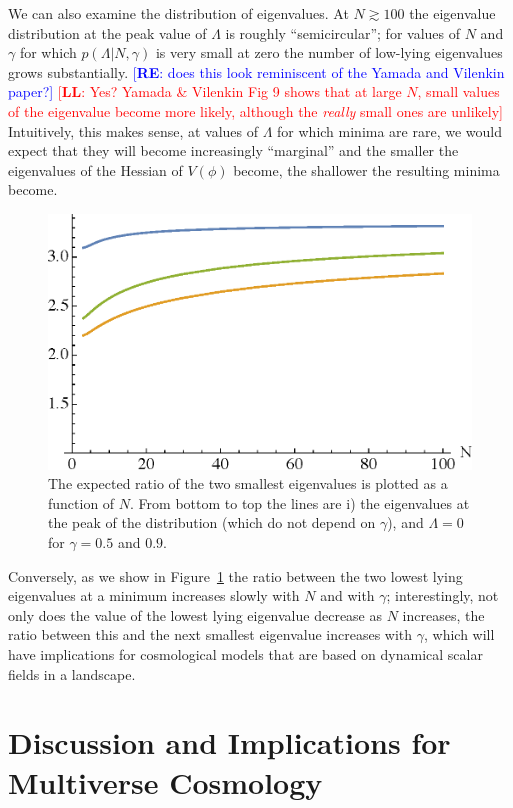 \documentclass[12pt]{article}
\newcommand{\re}[1]{\textcolor{blue}{[{\bf RE}: #1]}}
\newcommand{\lfl}[1]{\textcolor{red}{[{\bf LL}: #1]}}
\begin{document}
We can also examine the distribution of eigenvalues. At  $N\gtrsim 100$ the eigenvalue distribution at the peak value of $\Lambda$ is roughly ``semicircular''; for values of $N$ and $\gamma$ for which $p(\Lambda|N,\gamma)$ is very small at zero the number of low-lying eigenvalues grows substantially. \re{does this look reminiscent of the Yamada and Vilenkin paper?} \lfl{Yes? Yamada \& Vilenkin Fig 9 shows that at large $N$, small values of the eigenvalue become more likely, although the \emph{really} small ones are unlikely} Intuitively, this makes sense, at values of $\Lambda$ for which minima are rare, we would expect that they will become increasingly ``marginal'' and the smaller the eigenvalues of the Hessian of $V(\phi)$ become, the shallower the resulting minima become. 

\begin{figure} 
  \centering
  \includegraphics[width=.6\linewidth]{ratio.eps}  
  \caption{The expected ratio of the two smallest eigenvalues is plotted as a function of $N$.   From bottom to top the lines are i) the eigenvalues at the peak  of the distribution (which do not depend on $\gamma$), and $\Lambda=0$ for $\gamma =0.5$ and $0.9$.}
  \label{ratio}
\end{figure}

Conversely, as we show in Figure~\ref{ratio} the ratio between the two lowest lying eigenvalues at a minimum increases slowly with $N$ and with $\gamma$; interestingly, not only does the value of the lowest lying eigenvalue decrease as  $N$ increases, the ratio between this and the next smallest eigenvalue increases with $\gamma$, which will have implications for cosmological models that are based on dynamical scalar fields in a landscape. 





 
\section{Discussion and Implications for Multiverse Cosmology}
\end{document}

